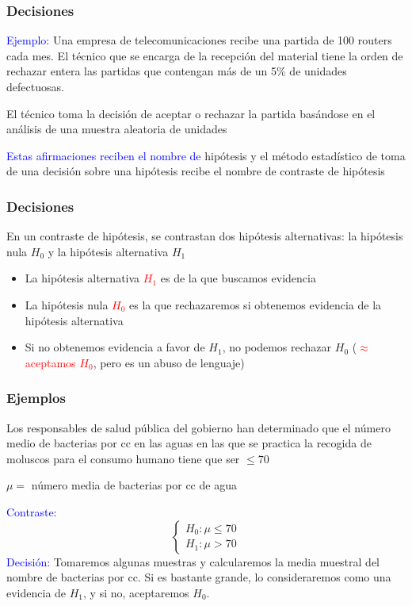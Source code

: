 \documentclass[12pt,t]{beamer}\usepackage[]{graphicx}\usepackage[]{color}
\newcommand{\red}[1]{\textcolor{red}{#1}}
\newcommand{\blue}[1]{\textcolor{blue}{#1}}
\renewcommand{\emph}[1]{{\color{red}#1}}
\renewcommand{\leq}{\leqslant}
\theoremstyle{plain}
\theoremstyle{definition}
\begin{document}
\begin{frame}

\frametitle{Decisiones}

{\blue{Ejemplo:}
Una empresa de telecomunicaciones recibe una partida de 100 routers cada mes. El técnico  que se encarga de la recepción del material tiene la orden de rechazar entera las partidas que contengan más de un 5\% de unidades defectuosas.}
\medskip

El técnico toma la decisión de aceptar o rechazar la partida basándose en el análisis de una muestra aleatoria de unidades

\medskip
\medskip
\medskip

\blue{Estas  afirmaciones reciben el nombre de} \emph{hipótesis} y el método
estadístico de toma  de  una decisión sobre una hipótesis recibe el nombre de \emph{contraste de hipótesis}
\end{frame}




\begin{frame}

\frametitle{Decisiones}

En un contraste de hipótesis, se contrastan dos hipótesis  alternativas: la \emph{hipótesis nula} $H_{0}$ y la \emph{hipótesis
alternativa} $H_{1}$
\medskip

\begin{itemize}
\item La hipótesis alternativa \red{$H_{1}$} es de la que buscamos evidencia
\medskip

\item La hipótesis nula \red{$H_{0}$} es la que rechazaremos si obtenemos evidencia de la hipótesis alternativa
\medskip

\item Si no obtenemos evidencia a favor de $H_1$, \emph{no podemos rechazar $H_0$} 
(\red{$\approx$ aceptamos $H_0$}, pero es un abuso de lenguaje)
\end{itemize}

\end{frame}

\begin{frame}
\frametitle{Ejemplos}

Los  responsables de salud pública  del gobierno han determinado que el número medio de bacterias por cc en las aguas  en las que se practica la recogida de moluscos para el consumo humano tiene que ser $\leq 70$
\medskip

$\mu=$ número media de bacterias por cc de agua
\medskip

\blue{Contraste:}
$$
\left\{\begin{array}{ll} 
H_{0}:\mu\leq 70\\ 
H_{1}:\mu>70
\end{array}
\right.
$$
\blue{Decisión:} Tomaremos algunas muestras y calcularemos la media muestral del nombre de bacterias por cc. Si es bastante grande, lo consideraremos como una  evidencia de $H_1$, y si no, aceptaremos $H_0$.

\end{frame}
\end{document}
